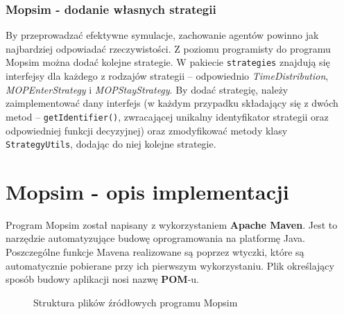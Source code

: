 \subsubsection{Mopsim - dodanie własnych strategii}
By przeprowadzać efektywne symulacje, zachowanie agentów powinno jak najbardziej odpowiadać rzeczywistości. Z poziomu programisty do programu Mopsim można dodać kolejne strategie. W pakiecie \texttt{strategies} znajdują się interfejsy dla każdego z rodzajów strategii -- odpowiednio \textit{TimeDistribution}, \textit{MOPEnterStrategy} i \textit{MOPStayStrategy}. By dodać strategię, należy zaimplementować dany interfejs (w każdym przypadku składający się z dwóch metod -- \texttt{getIdentifier()}, zwracającej unikalny identyfikator strategii oraz odpowiedniej funkcji decyzyjnej) oraz zmodyfikować metody klasy \texttt{StrategyUtils}, dodając do niej kolejne strategie.

\section{Mopsim - opis implementacji}
Program Mopsim został napisany z wykorzystaniem \textbf{Apache Maven}. Jest to narzędzie automatyzujące budowę oprogramowania na platformę Java. Poszczególne funkcje Mavena realizowane są poprzez wtyczki, które są automatycznie pobierane przy ich pierwszym wykorzystaniu. Plik określający sposób budowy aplikacji nosi nazwę \textbf{POM}-u.

\begin{figure}[!htb]
\caption{Struktura plików źródłowych programu Mopsim}
\label{mopsim_structure}
\end{figure}
